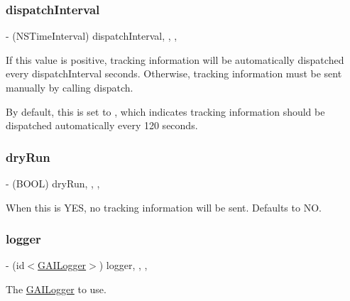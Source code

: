 \subsubsection{\texorpdfstring{dispatch\+Interval}{dispatchInterval}}
{\footnotesize\ttfamily -\/ (N\+S\+Time\+Interval) dispatch\+Interval\hspace{0.3cm}{\ttfamily [read]}, {\ttfamily [write]}, {\ttfamily [nonatomic]}, {\ttfamily [assign]}}

If this value is positive, tracking information will be automatically dispatched every dispatch\+Interval seconds. Otherwise, tracking information must be sent manually by calling dispatch.

By default, this is set to {}, which indicates tracking information should be dispatched automatically every 120 seconds. \mbox{\label{interface_g_a_i_aa42ce3bc919eeb55840c414c04d72497}} 
\subsubsection{\texorpdfstring{dry\+Run}{dryRun}}
{\footnotesize\ttfamily -\/ (B\+O\+OL) dry\+Run\hspace{0.3cm}{\ttfamily [read]}, {\ttfamily [write]}, {\ttfamily [nonatomic]}, {\ttfamily [assign]}}

When this is \textquotesingle{}Y\+ES\textquotesingle{}, no tracking information will be sent. Defaults to \textquotesingle{}NO\textquotesingle{}. \mbox{\label{interface_g_a_i_a0f8b5edd02f567ee270b23b1d57264a3}} 
\subsubsection{\texorpdfstring{logger}{logger}}
{\footnotesize\ttfamily -\/ (id$<$\hyperlink{protocol_g_a_i_logger-p}{G\+A\+I\+Logger}$>$) logger\hspace{0.3cm}{\ttfamily [read]}, {\ttfamily [write]}, {\ttfamily [nonatomic]}, {\ttfamily [retain]}}

The \hyperlink{protocol_g_a_i_logger-p}{G\+A\+I\+Logger} to use. \mbox{\label{interface_g_a_i_a9cff3fd3bd10af9b8560ef92cc0732a8}} 
